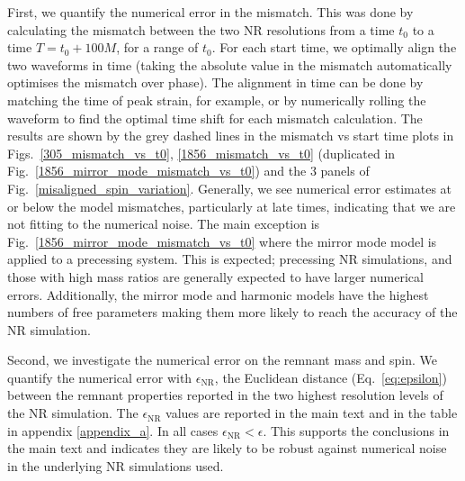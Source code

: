 First, we quantify the numerical error in the mismatch.
This was done by calculating the mismatch between the two NR resolutions from a time $t_0$ to a time $T = t_0 + 100M$, for a range of $t_0$. For each start time, we optimally align the two waveforms in time (taking the absolute value in the mismatch automatically optimises the mismatch over phase). The alignment in time can be done by matching the time of peak strain, for example, or by numerically rolling the waveform to find the optimal time shift for each mismatch calculation.
The results are shown by the grey dashed lines in the mismatch vs start time plots in Figs.~\ref{305_mismatch_vs_t0}, \ref{1856_mismatch_vs_t0} (duplicated in Fig.~\ref{1856_mirror_mode_mismatch_vs_t0}) and the 3 panels of Fig.~\ref{misaligned_spin_variation}.
Generally, we see numerical error estimates at or below the model mismatches, particularly at late times, indicating that we are not fitting to the numerical noise.
The main exception is Fig.~\ref{1856_mirror_mode_mismatch_vs_t0} where the mirror mode model is applied to a precessing system. This is expected; precessing NR simulations, and those with high mass ratios are generally expected to have larger numerical errors. Additionally, the mirror mode and harmonic models have the highest numbers of free parameters making them more likely to reach the accuracy of the NR simulation. 

Second, we investigate the numerical error on the remnant mass and spin.
We quantify the numerical error with $\epsilon_{\mathrm{NR}}$, the Euclidean distance (Eq.~\ref{eq:epsilon}) between the remnant properties reported in the two highest resolution levels of the NR simulation.
The $\epsilon_{\mathrm{NR}}$ values are reported in the main text and in the table in appendix \ref{appendix_a}.
In all cases $\epsilon_{\mathrm{NR}} < \epsilon$. This supports the conclusions in the main text and indicates they are likely to be robust against numerical noise in the underlying NR simulations used.

